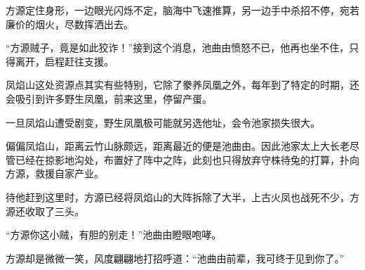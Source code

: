 \begin{this_body}
方源定住身形，一边眼光闪烁不定，脑海中飞速推算，另一边手中杀招不停，宛若廉价的烟火，尽数挥洒出去。

“方源贼子，竟是如此狡诈！”接到这个消息，池曲由愤怒不已，他再也坐不住，只得离开，启程赶往支援。

凤焰山这处资源点其实有些特别，它除了豢养凤凰之外，每年到了特定的时期，还会吸引到许多野生凤凰，前来这里，停留产蛋。

一旦凤焰山遭受剧变，野生凤凰极可能就另选他址，会令池家损失很大。

偏偏凤焰山，距离云竹山脉颇远，距离最近的便是池曲由。因此池家太上大长老尽管已经在掠影地沟处，布置好了阵中之阵，此刻也只得放弃守株待兔的打算，扑向方源，救援自家产业。

待他赶到这里时，方源已经将凤焰山的大阵拆除了大半，上古火凤也战死不少，方源还收取了三头。

“方源你这小贼，有胆的别走！”池曲由瞪眼咆哮。

方源却是微微一笑，风度翩翩地打招呼道：“池曲由前辈，我可终于见到你了。”

\end{this_body}

